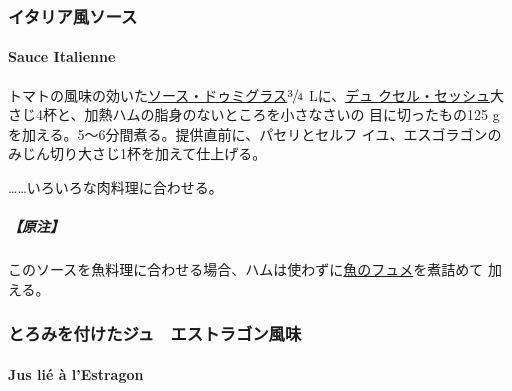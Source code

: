 \maeaki

\hypertarget{ux30a4ux30bfux30eaux30a2ux98a8ux30bdux30fcux30b9}{%
\subsubsection{イタリア風ソース}\label{ux30a4ux30bfux30eaux30a2ux98a8ux30bdux30fcux30b9}}

\hypertarget{sauce-italienne}{%
\paragraph{Sauce Italienne}\label{sauce-italienne}}


トマトの風味の効いた\protect\hyperlink{sauce-demi-glace}{ソース・ドゥミグラス}\(\sfrac{3}{4}\)
Lに、\href{}{デュ
クセル・セッシュ}大さじ4杯と、加熱ハムの脂身のないところを小さなさいの
目に切ったもの125 gを加える。5〜6分間煮る。提供直前に、パセリとセルフ
イユ、エスゴラゴンのみじん切り大さじ1杯を加えて仕上げる。

\ldots{}\ldots{}いろいろな肉料理に合わせる。

\hypertarget{ux539fux6ce8-4}{%
\subparagraph{【原注】}\label{ux539fux6ce8-4}}

このソースを魚料理に合わせる場合、ハムは使わずに\protect\hyperlink{fumet-de-poisson}{魚のフュメ}を煮詰めて
加える。

\maeaki

\hypertarget{ux3068ux308dux307fux3092ux4ed8ux3051ux305fux30b8ux30e5ux30a8ux30b9ux30c8ux30e9ux30b4ux30f3ux98a8ux5473}{%
\subsubsection{とろみを付けたジュ　エストラゴン風味}\label{ux3068ux308dux307fux3092ux4ed8ux3051ux305fux30b8ux30e5ux30a8ux30b9ux30c8ux30e9ux30b4ux30f3ux98a8ux5473}}

\hypertarget{jus-lie-a-lestragon}{%
\paragraph{Jus lié à l'Estragon}\label{jus-lie-a-lestragon}}


